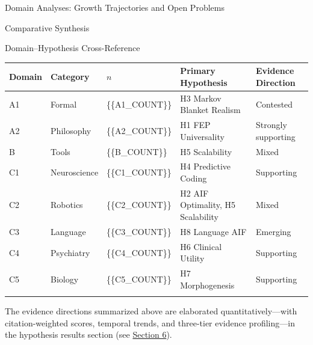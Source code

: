 \documentclass[
  ignorenonframetext,
]{beamer}
\newcounter{none} %
\begin{document}
\begin{frame}{Domain Analyses: Growth Trajectories and Open Problems
\label{sec:subfield_analyses}}
\begin{block}{Comparative Synthesis}
\begin{block}{Domain--Hypothesis Cross-Reference}
{\def\LTcaptype{none} %
\begin{longtable}[]{@{}
  >{\raggedright\arraybackslash}p{}
  >{\raggedright\arraybackslash}p{}
  >{\raggedright\arraybackslash}p{}
  >{\raggedright\arraybackslash}p{}
  >{\raggedright\arraybackslash}p{}@{}}
\toprule\noalign{}
\begin{minipage}[b]{\linewidth}\raggedright
Domain
\end{minipage} & \begin{minipage}[b]{\linewidth}\raggedright
Category
\end{minipage} & \begin{minipage}[b]{\linewidth}\raggedright
\(n\)
\end{minipage} & \begin{minipage}[b]{\linewidth}\raggedright
Primary Hypothesis
\end{minipage} & \begin{minipage}[b]{\linewidth}\raggedright
Evidence Direction
\end{minipage} \\
\midrule\noalign{}
\endhead
A1 & Formal & \{\{A1\_COUNT\}\} & H3 Markov Blanket Realism &
Contested \\
A2 & Philosophy & \{\{A2\_COUNT\}\} & H1 FEP Universality & Strongly
supporting \\
B & Tools & \{\{B\_COUNT\}\} & H5 Scalability & Mixed \\
C1 & Neuroscience & \{\{C1\_COUNT\}\} & H4 Predictive Coding &
Supporting \\
C2 & Robotics & \{\{C2\_COUNT\}\} & H2 AIF Optimality, H5 Scalability &
Mixed \\
C3 & Language & \{\{C3\_COUNT\}\} & H8 Language AIF & Emerging \\
C4 & Psychiatry & \{\{C4\_COUNT\}\} & H6 Clinical Utility &
Supporting \\
C5 & Biology & \{\{C5\_COUNT\}\} & H7 Morphogenesis & Supporting \\
\bottomrule\noalign{}
\end{longtable}
}

The evidence directions summarized above are elaborated
quantitatively---with citation-weighted scores, temporal trends, and
three-tier evidence profiling---in the hypothesis results section (see
\hyperref[sec:hypothesis_results]{Section 6}).
\end{block}
\end{block}
\end{frame}
\end{document}
